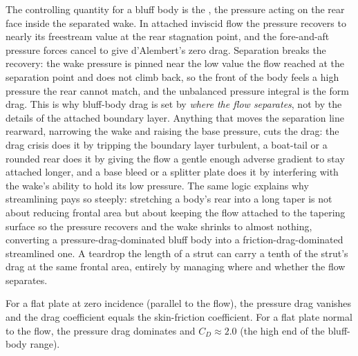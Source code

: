 The controlling quantity for a bluff body is the , the pressure acting on the rear face inside the separated
wake. In attached inviscid flow the pressure recovers to nearly its
freestream value at the rear stagnation point, and the fore-and-aft
pressure forces cancel to give d'Alembert's zero drag. Separation
breaks the recovery: the wake pressure is pinned near the low value the
flow reached at the separation point and does not climb back, so the
front of the body feels a high pressure the rear cannot match, and the
unbalanced pressure integral is the form drag. This is why bluff-body
drag is set by \emph{where the flow separates}, not by the details of
the attached boundary layer. Anything that moves the separation line
rearward, narrowing the wake and raising the base pressure, cuts the
drag: the drag crisis does it by tripping the boundary layer turbulent,
a boat-tail or a rounded rear does it by giving the flow a gentle
enough adverse gradient to stay attached longer, and a base bleed or a
splitter plate does it by interfering with the wake's ability to hold
its low pressure. The same logic explains why streamlining pays so
steeply: stretching a body's rear into a long taper is not about
reducing frontal area but about keeping the flow attached to the
tapering surface so the pressure recovers and the wake shrinks to
almost nothing, converting a pressure-drag-dominated bluff body into a
friction-drag-dominated streamlined one. A teardrop the length of a
strut can carry a tenth of the strut's drag at the same frontal area,
entirely by managing where and whether the flow separates.

For a flat plate at zero incidence (parallel to the flow), the
pressure drag vanishes and the drag coefficient equals the
skin-friction coefficient. For a flat plate normal to the flow,
the pressure drag dominates and $C_D \approx 2.0$ (the high end of
the bluff-body range).

